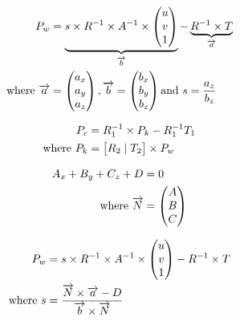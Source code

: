 \begin{align}
	\label{equation:3dlaserpoint}				
	P_w &= 	\underbrace{s \times R^{-1} 
 					 							\times A^{-1} 
					 							\times \begin{pmatrix}
								  								u \\
								  								v \\
								  								1 \\
								 								\end{pmatrix}
										 }_\text{$\overrightarrow{b}$}
					- 
					\underbrace{
											R^{-1} \times T					
										 }_\text{$\overrightarrow{a}$} \\
	\text{where}~	
	\overrightarrow{a} &= \begin{pmatrix}
													a_x \\
													a_y \\
													a_z \\
												\end{pmatrix}, 
	\overrightarrow{b} = \begin{pmatrix}
													b_x \\
													b_y \\
													b_z \\
												\end{pmatrix} \text{and}~
	s = \frac{a_z}{b_z} \notag
\end{align}

\begin{align}
	\label{equation:right2left}				
	P_c &= R_1^{-1} \times P_k - R_1^{-1}T_1 \\
	\text{where}~ 
	P_k &= \begin{bmatrix}
									R_2 \mid T_2
 				  \end{bmatrix} \times P_w \notag
\end{align}

\begin{align}
	\label{equation:laserplaneequation}				
	A_x + B_y + C_z + D &= 0 \\
	\text{where}~
	 \overrightarrow{N} &=
	 \begin{pmatrix}
	  A \\
	  B \\
	  C \\
	 \end{pmatrix} \notag
\end{align}

\begin{align}
	\label{equation:3dobjectpoint}				
	P_w &= s \times R^{-1} 
 					 \times A^{-1} 
					 \times \begin{pmatrix}
								  u \\
								  v \\
								  1 \\
								 \end{pmatrix}
					- R^{-1} \times T \\
	\text{where}~	
	s &= \frac{\overrightarrow{N}\times\overrightarrow{a} - D}
						{\overrightarrow{b}\times\overrightarrow{N}} \notag
\end{align}